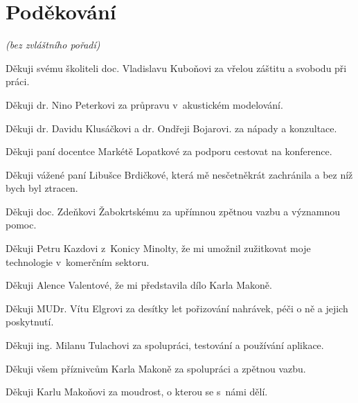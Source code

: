 \section{Poděkování}

{\em (bez zvláštního pořadí)}

Děkuji svému školiteli doc. Vladislavu Kuboňovi za vřelou záštitu a svobodu při
práci.

Děkuji dr. Nino Peterkovi za průpravu v~akustickém modelování.

Děkuji dr. Davidu Klusáčkovi a dr. Ondřeji Bojarovi. za nápady a konzultace.

Děkuji paní docentce Markétě Lopatkové za podporu cestovat na konference.

Děkuji vážené paní Libušce Brdičkové, která mě nesčetněkrát zachránila a bez níž
bych byl ztracen.

Děkuji doc. Zdeňkovi Žabokrtskému za upřímnou zpětnou vazbu a významnou pomoc.

Děkuji Petru Kazdovi z~Konicy Minolty, že mi umožnil zužitkovat moje
technologie v~komerčním sektoru.

Děkuji Alence Valentové, že mi představila dílo Karla Makoně.

Děkuji MUDr. Vítu Elgrovi za desítky let pořizování nahrávek, péči o ně a jejich
poskytnutí.

Děkuji ing. Milanu Tulachovi za spolupráci, testování a používání aplikace.

Děkuji všem příznivcům Karla Makoně za spolupráci a zpětnou vazbu.

Děkuji Karlu Makoňovi za moudrost, o kterou se s~námi dělí.
